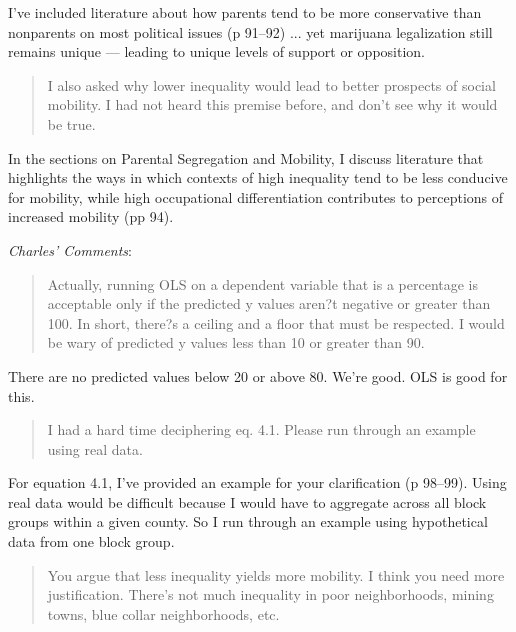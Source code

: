 \documentclass[12pt,stdletter,dateno,sigleft]{newlfm} %
\begin{document}
\begin{newlfm}
I've included literature about how parents tend to be more conservative than nonparents on most political issues (p 91--92) ... yet marijuana legalization still remains unique --- leading to unique levels of support or opposition. 

\begin{quotation}{\color{red}\noindent \footnotesize
I also asked why lower inequality would lead to better prospects of social mobility. I had not heard this premise before, and don't see why it would be true.
}
\end{quotation}

In the sections on Parental Segregation and Mobility, I discuss literature that highlights the ways in which contexts of high inequality tend to be less conducive for mobility, while high occupational differentiation contributes to perceptions of increased mobility (pp 94). \newline


\textit{Charles' Comments}:

\begin{quotation}{\color{red}\noindent \footnotesize
Actually, running OLS on a dependent variable that is a percentage is acceptable only if the predicted y values aren?t negative or greater than 100. In short, there?s a ceiling and a floor that must be respected. I would be wary of predicted y values less than 10 or greater than 90.
}
\end{quotation}

There are no predicted values below 20 or above 80. We're good. OLS is good for this. 

\begin{quotation}{\color{red}\noindent \footnotesize
I had a hard time deciphering eq. 4.1. Please run through an example using real data.
}
\end{quotation}

For equation 4.1, I've provided an example for your clarification (p 98--99). Using real data would be difficult because I would have to aggregate across all block groups within a given county. So I run through an example using hypothetical data from one block group.

\begin{quotation}{\color{red}\noindent \footnotesize
You argue that less inequality yields more mobility. I think you need more justification. There's not much inequality in poor neighborhoods, mining towns, blue collar neighborhoods, etc.
}
\end{quotation}



\end{newlfm}
\end{document}
